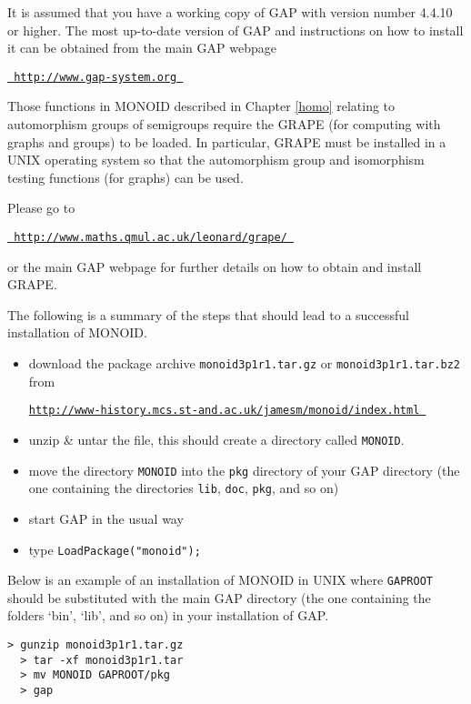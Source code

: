 \documentclass[a4paper,11pt]{report}
\begin{document}
{{ It is assumed that you have a working copy of \textsf{GAP} with version number 4.4.10 or higher. The most up-to-date version of \textsf{GAP} and instructions on how to install it can be obtained from the main \textsf{GAP} webpage

 \href{ http://www.gap-system.org } {\texttt{ http://www.gap-system.org }}

 Those functions in \textsf{MONOID} described in Chapter \ref{homo} relating to automorphism groups of semigroups require the \textsf{GRAPE} (for computing with graphs and groups) to be loaded. In particular, \textsf{GRAPE} must be installed in a UNIX operating system so that the automorphism group
and isomorphism testing functions (for graphs) can be used.

 Please go to 

 \href{ http://www.maths.qmul.ac.uk/~leonard/grape/ } {\texttt{ http://www.maths.qmul.ac.uk/\texttt{}leonard/grape/ }}

 or the main \textsf{GAP} webpage for further details on how to obtain and install \textsf{GRAPE}. 

 The following is a summary of the steps that should lead to a successful
installation of \textsf{MONOID}. 
\begin{itemize}
\item  download the package archive \texttt{monoid3p1r1.tar.gz} or \texttt{monoid3p1r1.tar.bz2} from 

 \href{http://www-history.mcs.st-and.ac.uk/~jamesm/monoid/index.html } {\texttt{http://www-history.mcs.st-and.ac.uk/\texttt{}jamesm/monoid/index.html }}

 
\item  unzip \& untar the file, this should create a directory called \texttt{MONOID}.
\item  move the directory \texttt{MONOID} into the \texttt{pkg} directory of your \textsf{GAP} directory (the one containing the directories \texttt{lib}, \texttt{doc}, \texttt{pkg}, and so on)
\item  start \textsf{GAP} in the usual way
\item  type \texttt{LoadPackage("monoid");}
\end{itemize}
 Below is an example of an installation of \textsf{MONOID} in UNIX where \texttt{GAPROOT} should be substituted with the main \textsf{GAP} directory (the one containing the folders `bin', `lib', and so on) in your
installation of \textsf{GAP}.

 
\begin{Verbatim}[fontsize=\small,frame=single,label=Example]
  > gunzip monoid3p1r1.tar.gz 
  > tar -xf monoid3p1r1.tar 
  > mv MONOID GAPROOT/pkg
  > gap 
  

\end{Verbatim}}}
\end{document}

